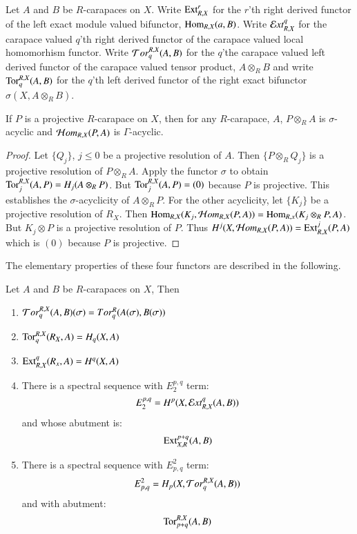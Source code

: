 \begin{definition}\label{art6-definition-3.2}
Let $A$ and $B$ be $R$-carapaces on $X$. Write $\operatorname{Ext}_{R, X}^{r}$ for the $r$'th right derived functor of the left exact module valued bifunctor, $\operatorname{Hom}_{R, X}(a, B)$. Write $\mathcal{E} xt_{R, X}^{q}$ for the carapace valued $q$'th right derived functor of the carapace valued local homomorhism functor. Write $\mathcal{T} or_{q}^{R,X}(A, B)$ for the $q$'the carapace valued left derived functor of the carapace valued tensor product, $A\otimes_{R}B$ and write $\operatorname{Tor}_{q}^{R, X}(A, B)$ for the $q$'th left derived functor of the right exact bifunctor $\sigma(X, A\otimes_{R}B)$. 
\end{definition}

\begin{lemma}\label{art6-lemma-3.3}
If $P$ is a projective $R$-carapace on $X$, then for any $R$-carapace, $A$, $P\otimes_{R} A$ is $\sigma$-acyclic and $\mathcal{H} om_{R, X}(P, A)$ is $\Gamma$-acyclic.
\end{lemma}

\begin{proof}
Let $\{Q_{j}\}$, $j \leq 0$ be  a projective resolution of $A$. Then $\{P \otimes_{R} Q_{j}\}$ is a projective resolution of $P \otimes_{R} A$. Apply the functor $\sigma$ to obtain $\operatorname{Tor}_{j}^{R,X}(A, P) = H_{j}(A\otimes_{R}P)$. But $\operatorname{Tor}_{j}^{R, X}(A, P) = (0)$ because $P$ is projective. This establishes the $\sigma$-acyclicity of $A\otimes_{R}P$. For the other acyclicity, let $\{K_{j}\}$ be a projective resolution of $R_{X}$. Then $\Hom_{R, X}(K_{j},\break \calH om_{R, X}(P, A)) = \Hom_{R, x}(K_{j}\otimes_{R}P, A)$. But $K_{j} \otimes P$ is a projective resolution of $P$. Thus $H^{j}(X, \mathcal{H} om_{R,X}(P, A)) = \operatorname{Ext}_{R, X}^{j}(P, A)$ which is $(0)$ because $P$ is projective.
\end{proof}

The elementary properties of these four functors are described in the following.

\begin{prop}\label{art6-lemma-3.4}
Let $A$ and $B$ be $R$-carapaces on $X$, Then
    \begin{enumerate}[(1)]
    \item $\mathcal{T} or_{q}^{R,X}(A, B)(\sigma) = Tor_{q}^{R}(A(\sigma), B(\sigma))$\label{art6-lemma3.4-enum-1}
    \item $\operatorname{Tor}_{q}^{R, X}(R_{X}, A) = H_{q}(X, A)$\label{art6-lemma3.4-enum-2}
    \item $\operatorname{Ext}_{R,X}^{q}(R_{x}, A) = H^{q}(X,A)$\label{art6-lemma3.4-enum-3}
    \item There is a spectral sequence with $E_{2}^{p,q}$ term:\label{art6-lemma3.4-enum-4}
    $$
    E_{2}^{p,q} = H^{p}(X, \mathcal{E} xt_{R,X}^{q}(A, B))
    $$
    and whose abutment is:
    $$
    \operatorname{Ext}_{X,R}^{p+q}(A, B)
    $$
    \item There is a spectral sequence with $E_{p,q}^{2}$ term:\label{art6-lemma3.4-enum-5}
    $$
    E_{p,q}^{2} = H_{p}(X, \mathcal{T} or_{q}^{R, X}(A, B))
    $$
    and with abutment:
    $$
    \operatorname{Tor}_{p+q}^{R,X}(A, B)
    $$
    \end{enumerate}
\end{prop}

